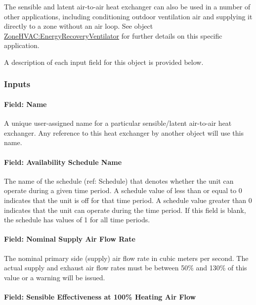 The sensible and latent air-to-air heat exchanger can also be used in a number of other applications, including conditioning outdoor ventilation air and supplying it directly to a zone without an air loop. See object \hyperref[zonehvacenergyrecoveryventilator]{ZoneHVAC:EnergyRecoveryVentilator} for further details on this specific application.

A description of each input field for this object is provided below.

\subsubsection{Inputs}\label{inputs-1-019}

\paragraph{Field: Name}\label{field-name-1-018}

A unique user-assigned name for a particular sensible/latent air-to-air heat exchanger. Any reference to this heat exchanger by another object will use this name.

\paragraph{Field: Availability Schedule Name}\label{field-availability-schedule-name-1-006}

The name of the schedule (ref: Schedule) that denotes whether the unit can operate during a given time period. A schedule value of less than or equal to 0 indicates that the unit is off for that time period. A schedule value greater than 0 indicates that the unit can operate during the time period. If this field is blank, the schedule has values of 1 for all time periods.

\paragraph{Field: Nominal Supply Air Flow Rate}\label{field-nominal-supply-air-flow-rate-1}

The nominal primary side (supply) air flow rate in cubic meters per second. The actual supply and exhaust air flow rates must be between 50\% and 130\% of this value or a warning will be issued.

\paragraph{Field: Sensible Effectiveness at 100\% Heating Air Flow}\label{field-sensible-effectiveness-at-100-heating-air-flow}

